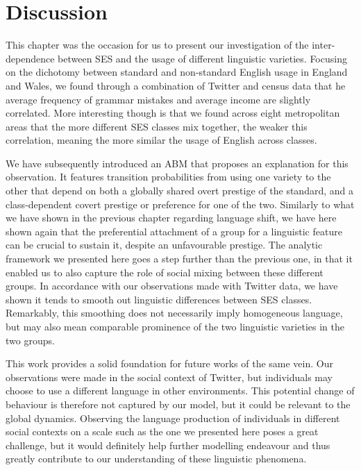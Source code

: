\documentclass[../thesis.tex]{subfiles}
\begin{document}
\section{Discussion}
This chapter was the occasion for us to present our investigation of the inter-dependence between \ac{SES} and the usage of different linguistic varieties.
Focusing on the dichotomy between standard and non-standard English usage in England and Wales, we found through a combination of Twitter and census data that he average frequency of grammar mistakes and average income are slightly correlated.
More interesting though is that we found across eight metropolitan areas that the more different \ac{SES} classes mix together, the weaker this correlation, meaning the more similar the usage of English across classes.

We have subsequently introduced an \ac{ABM} that proposes an explanation for this observation.
It features transition probabilities from using one variety to the other that depend on both a globally shared overt prestige of the standard, and a class-dependent covert prestige or preference for one of the two.
Similarly to what we have shown in the previous chapter regarding language shift, we have here shown again that the preferential attachment of a group for a linguistic feature can be crucial to sustain it, despite an unfavourable prestige.
The analytic framework we presented here goes a step further than the previous one, in that it enabled us to also capture the role of social mixing between these different groups.
In accordance with our observations made with Twitter data, we have shown it tends to smooth out linguistic differences between \ac{SES} classes.
Remarkably, this smoothing does not necessarily imply homogeneous language, but may also mean comparable prominence of the two linguistic varieties in the two groups.

This work provides a solid foundation for future works of the same vein.
Our observations were made in the social context of Twitter, but individuals may choose to use a different language in other environments.
This potential change of behaviour is therefore not captured by our model, but it could be relevant to the global dynamics.
Observing the language production of individuals in different social contexts on a scale such as the one we presented here poses a great challenge, but it would definitely help further modelling endeavour and thus greatly contribute to our understanding of these linguistic phenomena.
\end{document}
